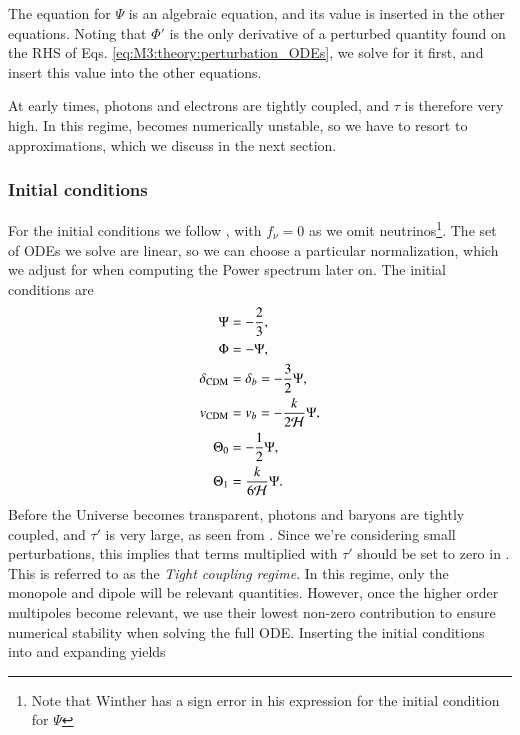 The equation for $\Psi$ is an algebraic equation, and its value is inserted in the other equations. Noting that $\Phi'$ is the only derivative of a perturbed quantity found on the RHS of Eqs. \eqref{eq:M3:theory:perturbation_ODEs}, we solve for it first, and insert this value into the other equations. 

At early times, photons and electrons are tightly coupled, and $\tau$ is therefore very high. In this regime,  becomes numerically unstable, so we have to resort to approximations, which we discuss in the next section. 



\subsubsection{Initial conditions} \label{sssec:M3:theory:initial_conditions}
For the initial conditions we follow \cite{winther}, with $f_\nu=0$ as we omit neutrinos\footnote{Note that Winther has a sign error in his expression for the initial condition for $\Psi$}. The set of ODEs we solve are linear, so we can choose a particular normalization, which we adjust for when computing the Power spectrum later on. The initial conditions are      
\begin{subequations} \label{eq:M3:theory:pert_ODE_IC}
    \begin{align}
        \Psi &= -\frac{2}{3}, \label{eq:M3:theory:pert_ODE_IC_Psi} \\
        \Phi &= - \Psi, \label{eq:M3:theory:pert_ODE_IC_Phi} \\
        \delta_\mathrm{CDM} &= \delta_b = -\frac{3}{2}\Psi, \label{eq:M3:theory:pert_ODE_IC_delta_cdm} \\
        v_\mathrm{CDM} &= v_b = -\frac{k}{2\mathcal{H}} \Psi, \label{eq:M3:theory:pert_ODE_IC_v_cdm} \\
        \Theta_0 &= -\frac{1}{2}\Psi, \label{eq:M3:theory:pert_ODE_IC_Theta0} \\
        \Theta_1 &= \frac{k}{6\mathcal{H}}\Psi. \label{eq:M3:theory:pert_ODE_IC_Theta1} 
    \end{align}
\end{subequations}
Before the Universe becomes transparent, photons and baryons are tightly coupled, and $\tau'$ is very large, as seen from . Since we're considering small perturbations, this implies that terms multiplied with $\tau'$ should be set to zero in . This is referred to as the \textit{Tight coupling regime}. In this regime, only the monopole and dipole will be relevant quantities. However, once the higher order multipoles become relevant, we use their lowest non-zero contribution to ensure numerical stability when solving the full ODE. Inserting the initial conditions into  and expanding yields 
